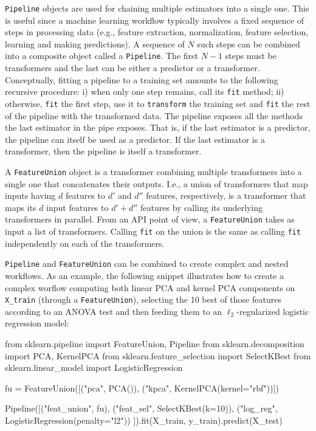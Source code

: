 \documentclass{llncs}
\begin{document}
\texttt{Pipeline} objects are used for chaining multiple estimators into a
single one. This is useful since a machine learning workflow typically involves
a fixed sequence of steps in processing data (e.g., feature extraction,
normalization, feature selection, learning and making predictions). A sequence
of $N$ such steps can be combined into a composite object called a
\texttt{Pipeline}. The first $N-1$ steps must be transformers and the last can
be either a predictor or a transformer. Conceptually, fitting a pipeline to a
training set amounts to the following recursive procedure: i) when only one step
remains, call its \texttt{fit} method; ii) otherwise, \texttt{fit} the first
step, use it to \texttt{transform} the training set and \texttt{fit} the rest of
the pipeline with the transformed data. The pipeline exposes all the methods the
last estimator in the pipe exposes. That is, if the last estimator is a
predictor, the pipeline can itself be used as a predictor. If the last estimator
is a transformer, then the pipeline is itself a transformer.

A \texttt{FeatureUnion} object is a transformer combining multiple transformers
into a single one that concatenates their outputs.
I.e., a union of transformers that map inputs having $d$ features
to $d'$ and $d''$ features, respectively,
is a transformer that maps its $d$ input features to $d' + d''$ features
by calling its underlying transformers in parallel.
From an API point of view, a
\texttt{FeatureUnion} takes as input a list of transformers. Calling
\texttt{fit} on the union is the same as calling \texttt{fit} independently on
each of the transformers.

\texttt{Pipeline} and \texttt{FeatureUnion} can be
combined to create complex and nested workflows.
As an example, the following snippet illustrates how to create a complex worflow
computing both linear PCA and kernel PCA components on \texttt{X\_train}
(through a \texttt{FeatureUnion}),
selecting the 10 best of those features according to an ANOVA test
and then feeding them to an $\ell_2$-regularized logistic regression model:
\begin{pythoncode}
from sklearn.pipeline import FeatureUnion, Pipeline
from sklearn.decomposition import PCA, KernelPCA
from sklearn.feature_selection import SelectKBest
from sklearn.linear_model import LogisticRegression

fu = FeatureUnion([("pca", PCA()),
                   ("kpca", KernelPCA(kernel="rbf"))])

Pipeline([("feat_union", fu),
          ("feat_sel", SelectKBest(k=10)),
          ("log_reg", LogisticRegression(penalty="l2"))
]).fit(X_train, y_train).predict(X_test)
\end{pythoncode}
\end{document}
